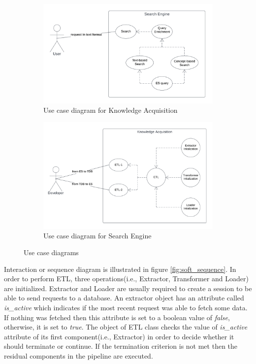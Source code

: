 \begin{figure}[H]
\centering
\begin{subfigure}{.5\textwidth}
  \centering
  \includegraphics[width=.75\linewidth]{../resources/soft_use_case_1.png}
  \caption{Use case diagram for Knowledge Acquisition}
  \label{fig:subsoft_use_case_1}
\end{subfigure}%
\begin{subfigure}{.5\textwidth}
  \centering
  \includegraphics[width=.75\linewidth]{../resources/soft_use_case_2.png}
  \caption{Use case diagram for Search Engine}
  \label{fig:soft_use_case_2}
\end{subfigure}
\caption{Use case diagrams}
\label{fig:soft_use_cases}
\end{figure}

% 

Interaction or sequence diagram is illustrated in figure \ref{fig:soft_sequence}. In order to 
perform ETL, three operations(i.e., Extractor, Transformer and Loader) are initialized. Extractor and 
Loader are usually required to create a session to be able to send requests to a database. An 
extractor 
object has an attribute called \textit{is\_active} which indicates if the most recent request was 
able to fetch some data. If nothing was fetched then this attribute is set to a boolean value of 
\textit{false}, otherwise, it is set to \textit{true}. The object of ETL class checks the value of 
\textit{is\_active} attribute of its first component(i.e., Extractor) in order to decide whether 
it should terminate or continue. If the termination criterion is not met then the residual 
components in the pipeline are executed.

